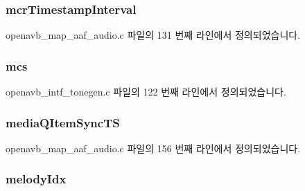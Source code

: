\subsubsection[{\texorpdfstring{mcr\+Timestamp\+Interval}{mcrTimestampInterval}}]{ mcr\+Timestamp\+Interval}\hypertarget{structpvt__data__t_ac7b90d0d579e65ccc338cb3b63bc0a12}{}\label{structpvt__data__t_ac7b90d0d579e65ccc338cb3b63bc0a12}


openavb\+\_\+map\+\_\+aaf\+\_\+audio.\+c 파일의 131 번째 라인에서 정의되었습니다.

\subsubsection[{\texorpdfstring{mcs}{mcs}}]{ mcs}\hypertarget{structpvt__data__t_aeae67b5199bbd13cc6ba11f25244aca4}{}\label{structpvt__data__t_aeae67b5199bbd13cc6ba11f25244aca4}


openavb\+\_\+intf\+\_\+tonegen.\+c 파일의 122 번째 라인에서 정의되었습니다.

\subsubsection[{\texorpdfstring{media\+Q\+Item\+Sync\+TS}{mediaQItemSyncTS}}]{ media\+Q\+Item\+Sync\+TS}\hypertarget{structpvt__data__t_a4dfb6959744d8eb6b01a014fd1a7b75b}{}\label{structpvt__data__t_a4dfb6959744d8eb6b01a014fd1a7b75b}


openavb\+\_\+map\+\_\+aaf\+\_\+audio.\+c 파일의 156 번째 라인에서 정의되었습니다.

\subsubsection[{\texorpdfstring{melody\+Idx}{melodyIdx}}]{ melody\+Idx}\hypertarget{structpvt__data__t_a4076c3857ea8e7812c5d51caab0c961e}{}\label{structpvt__data__t_a4076c3857ea8e7812c5d51caab0c961e}


